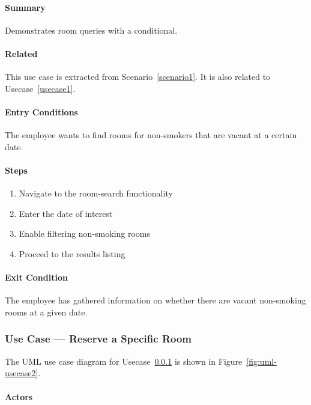 \paragraph{Summary}

Demonstrates room queries with a conditional.

\paragraph{Related}
This use case is extracted from Scenario~\ref{scenario1}.
It is also related to Usecase~\ref{usecase1}.

\paragraph{Entry Conditions}

The employee wants to find rooms for non-smokers that are vacant at a
certain date.

\paragraph{Steps}

\begin{enumerate}
\def\labelenumi{\arabic{enumi}.}
\tightlist
\item
  Navigate to the room-search functionality
\item
  Enter the date of interest
\item
  Enable filtering non-smoking rooms
\item
  Proceed to the results listing
\end{enumerate}

\paragraph{Exit Condition}

The employee has gathered information on whether there are vacant
non-smoking rooms at a given date.

\subsubsection{Use Case --- Reserve a Specific Room}\label{usecase3}
The UML use case diagram for Usecase~\ref{usecase3} is shown in Figure~\ref{fig:uml-usecase2}.

\paragraph{Actors}

